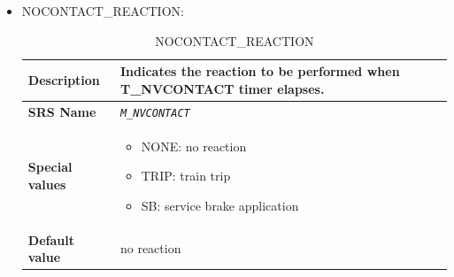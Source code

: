 \begin{itemize}
\begin{longtable}{|l|l|}
				\hline

			\end{longtable}

		\item NOCONTACT\_REACTION:

			\begin{longtable}{|l|l|}
				\caption{NOCONTACT\_REACTION}\\
				\hline

					\begin{minipage}[t]{0.22\linewidth} \textbf{Description}	\end{minipage}
				&	\begin{minipage}[t]{0.78\linewidth} Indicates the reaction to be performed when T\_NVCONTACT timer elapses. \end{minipage} \\

				\hline

					\begin{minipage}[t]{0.22\linewidth} \textbf{SRS Name}	\end{minipage}
				&	\begin{minipage}[t]{0.78\linewidth} \emph{\texttt{M\_NVCONTACT}} \end{minipage} \\

				\hline

					\begin{minipage}[t]{0.22\linewidth} \textbf{Special values}	\end{minipage}
				&	\begin{minipage}[t]{0.78\linewidth} \begin{itemize} \item NONE: no reaction \item TRIP: train trip \item SB: service brake application \end{itemize} \end{minipage} \\

				\hline

					\begin{minipage}[t]{0.22\linewidth} \textbf{Default value}	\end{minipage}
				&	\begin{minipage}[t]{0.78\linewidth} no reaction \end{minipage} \\

				\hline


\end{longtable}
\end{itemize}
